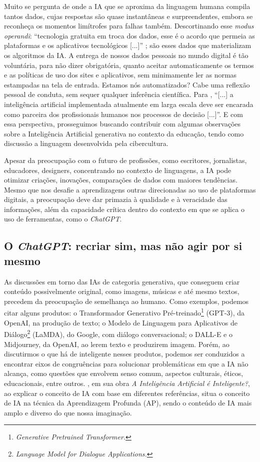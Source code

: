 \documentclass[portuguese]{textolivre}
\begin{document}
Muito se pergunta de onde a IA que se aproxima da linguagem humana compila tantos dados, cujas respostas são quase instantâneas e surpreendentes, embora se reconheça os momentos limítrofes para falhas também. Descortinando esse \emph{modus operandi}: “tecnologia gratuita em troca dos dados, esse é o acordo que permeia as plataformas e os aplicativos tecnológicos [...]” \cite[p. 301]{2022kaufman}; são esses dados que materializam os algoritmos da IA. A entrega de nossos dados pessoais no mundo digital é tão voluntária, para não dizer obrigatória, quanto aceitar automaticamente os termos e as políticas de uso dos sites e aplicativos, sem minimamente ler as normas estampadas na tela de entrada. Estamos nós automatizados? Cabe uma reflexão pessoal de conduta, sem sequer qualquer inferência científica. Para \textcite[p. 43]{2022kaufman}, “[...] a inteligência artificial implementada atualmente em larga escala deve ser encarada como parceira dos profissionais humanos nos processos de decisão [...]”. E com essa perspectiva, prosseguimos buscando contribuir com algumas observações sobre a Inteligência Artificial generativa no contexto da educação, tendo como discussão a linguagem desenvolvida pela cibercultura.

Apesar da preocupação com o futuro de profissões, como escritores, jornalistas, educadores, designers, concentrando no contexto de linguagens, a IA pode otimizar criações, inovações, comparações de dados com maiores tendências. Mesmo que nos desafie a aprendizagens outras direcionadas ao uso de plataformas digitais, a preocupação deve dar primazia à qualidade e à veracidade das informações, além da capacidade crítica dentro do contexto em que se aplica o uso de ferramentas, como o \emph{ChatGPT}. 


\subsection{O \emph{ChatGPT}: recriar sim, mas não agir por si mesmo}

As discussões em torno das IAs de categoria generativa, que conseguem criar conteúdo possivelmente original, como imagens, músicas e até mesmo textos, precedem da preocupação de semelhança ao humano. Como exemplos, podemos citar alguns produtos: o Transformador Generativo Pré-treinado\footnote{\emph{Generative Pretrained Transformer.}} (GPT-3), da OpenAI, na produção de texto; o Modelo de Linguagem para Aplicativos de Diálogo\footnote{\emph{Language Model for Dialogue Applications.}} (LaMDA), do Google, com diálogo conversacional; o DALL-E e o Midjourney, da OpenAI, ao lerem texto e produzirem imagem. Porém, ao discutirmos o que há de inteligente nesses produtos, podemos ser conduzidos a encontrar eixos de congruências para solucionar problemáticas em que a IA não alcança, como questões que envolvem senso comum, aspectos culturais, éticos, educacionais, entre outros. \textcite[p. 165]{santaella2023inteligencia}, em sua obra \emph{A Inteligência Artificial é Inteligente?}, ao explicar o conceito de IA com base em diferentes referências, situa o conceito de IA na técnica da Aprendizagem Profunda (AP), sendo o conteúdo de IA mais amplo e diverso do que nossa imaginação. 
\end{document}
